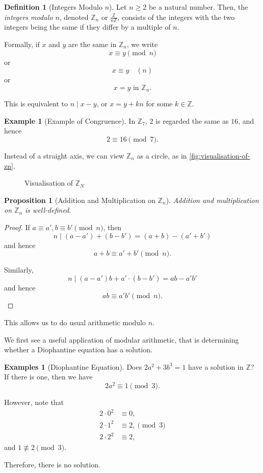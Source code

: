\documentclass{article}
\newtheorem{proposition}[theorem]{Proposition}
\theoremstyle{definition}
\newtheorem{definition}[theorem]{Definition}
\newtheorem{example}[theorem]{Example}
\newtheorem{examples}[theorem]{Examples}
\theoremstyle{remark}
\newcommand{\pqty}[1]{\left(#1\right)}
\newcommand{\flatfrac}[2]{\frac{#1}{#2}}
\newcommand{\divides}{\mid}
\newcommand{\nequiv}{\not\equiv}
\newcommand{\ZZ}{\mathbb{Z}}
\begin{document}
\begin{definition}[Integers Modulo \(n\)]
    Let \(n \geq 2\) be a natural number. Then, the \emph{integers modulo \(n\)}, denoted \(\ZZ_{n}\) or \(\flatfrac{\ZZ}{n\ZZ}\), consists of the integers with the two integers being the same if they differ by a multiple of \(n\).

    Formally, if \(x\) and \(y\) are the same in \(\ZZ_n\), we write
    \[
        x \equiv y \pmod{n}
    \]
    or
    \[
        x \equiv y \quad \pqty{n}
    \]
    or
    \[
        x = y \text{ in } \ZZ_n.
    \]

    This is equivalent to \(n \divides x - y\), or \(x = y + kn\) for some \(k \in \ZZ\).
\end{definition}

\begin{example}[Example of Congruence]
    In \(\ZZ_7\), \(2\) is regarded the same as \(16\), and hence
    \[
        2 \equiv 16 \pmod 7.
    \]
\end{example}

Instead of a straight axis, we can view \(\ZZ_n\) as a circle, as in \autoref{fig:visualisation-of-zn}.

\begin{figure}[ht!]
    \centering
    \caption{Visualisation of \(\ZZ_N\)}
    \label{fig:visualisation-of-zn}
\end{figure}

\begin{proposition}[Addition and Multiplication on \(\ZZ_n\)]
    Addition and multiplication on \(\ZZ_n\) is well-defined.
\end{proposition}

\begin{proof}
    If \(a \equiv a', b \equiv b' \pmod{n}\), then
    \[
        n \divides \pqty{a - a'} + \pqty{b - b'} = \pqty{a + b} - \pqty{a' + b'}
    \]
    and hence
    \[
        a + b \equiv a' + b' \pmod{n}.
    \]

    Similarly,
    \[
        n \divides \pqty{a - a'} b + a' \cdot \pqty{b - b'} = ab - a' b'
    \]
    and hence
    \[
        ab \equiv a' b' \pmod{n}.
    \]
\end{proof}

This allows us to do usual arithmetic modulo \(n\).

We first see a useful application of modular arithmetic, that is determining whether a Diophantine equation has a solution.

\begin{examples}[Diophantine Equation]
    Does \(2a^2 + 3b^3 = 1\) have a solution in \(\ZZ\)? If there is one, then we have
    \[
        2a^2 \equiv 1 \pmod{3}.
    \]

    However, note that
    \begin{align*}
        2 \cdot 0^2 &\equiv 0, \\
        2 \cdot 1^2 &\equiv 2, \pmod{3} \\
        2 \cdot 2^2 &\equiv 2,
    \end{align*}
    and \(1 \nequiv 2 \pmod{3}\).

    Therefore, there is no solution.
\end{examples}
\end{document}
